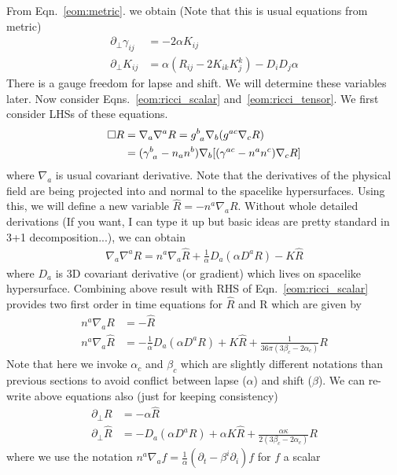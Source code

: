 \documentclass[a4paper,oneside,openany,11pt]{memoir}
\numberwithin{equation}{section} %
\begin{document}
From Eqn.~\ref{eom:metric}. we obtain (Note that this is usual equations from metric)
\begin{align}
\partial_\bot \gamma_{ij} &= - 2 \alpha K_{ij} \\
\partial_\bot K_{ij} &= \alpha (R_{ij} - 2 K_{ik}K^{k}_j) - D_i D_j \alpha
\end{align}
There is a gauge freedom for lapse and shift. We will determine these variables later.
Now consider Eqns.~\ref{eom:ricci_scalar} and~\ref{eom:ricci_tensor}.
We first consider LHSs of these equations. 
\begin{align}
\Box R &= \nabla_a \nabla^a R 
=g\indices{^b_a} \nabla_b(g^{ac} \nabla_c R) \nonumber \\
&= (\gamma\indices{^b_a} - n_a n^b)\nabla_b [(\gamma^{ac} - n^a n^c) \nabla_c R]
\end{align} 
where $\nabla_a$ is usual covariant derivative.
Note that the derivatives of the physical field are being projected into and normal to the spacelike
hypersurfaces. Using this, we will define a new variable $\hat{R} = - n^a \nabla_a R$.
Without whole detailed derivations (If you want, I can type it up but basic ideas are pretty standard in 
3+1 decomposition...), we can obtain
\begin{align}
\nabla_a \nabla^a R = n^a \nabla_a \hat{R} + \frac{1}{\alpha} D_a (\alpha D^a R) - K \hat{R}
\end{align}
where $D_a$ is 3D covariant derivative (or gradient) which lives on spacelike hypersurface.
Combining above result with RHS of Eqn.~\ref{eom:ricci_scalar} provides two first order in time equations
for $\hat{R}$ and R which are given by
\begin{align}
n^a \nabla_a R &= - \hat{R}  \\
n^a \nabla_a \hat{R} &= -  \frac{1}{\alpha} D_a (\alpha D^a R) + K \hat{R} + \frac{1}{36 \pi (3\beta_c - 2 \alpha_c)} R
\end{align}
Note that here we invoke $\alpha_c$ and $\beta_c$ which are slightly different notations than previous sections
to avoid conflict between lapse ($\alpha$) and shift ($\beta$).
We can re-write above equations also (just for keeping consistency)
\begin{align}
\partial_\bot R &= - \alpha \hat{R}  \\
\partial_\bot \hat{R} &= - D_a (\alpha D^a R) + \alpha K \hat{R} + \frac{\alpha \kappa}{2 (3\beta_c - 2 \alpha_c)} R
\end{align}
where we use the notation $n^a \nabla_a f = \frac{1}{\alpha} (\partial_t - \beta^i \partial_i)f$ for $f$ a scalar
\end{document}
